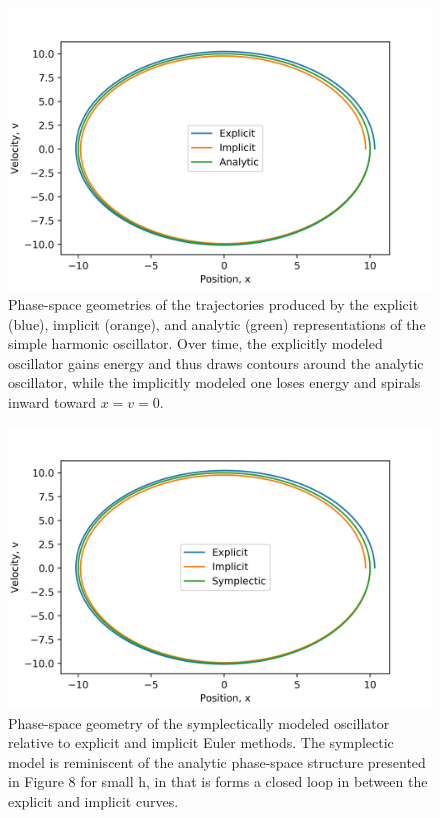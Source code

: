 \documentclass{article}
\begin{document}
\begin{figure}[H]
\includegraphics[width=\textwidth]{phase1.jpg}
\caption{Phase-space geometries of the trajectories produced by the explicit (blue), implicit (orange), and analytic (green) representations of the simple harmonic oscillator. Over time, the explicitly modeled oscillator gains energy and thus draws contours around the analytic oscillator, while the implicitly modeled one loses energy and spirals inward toward $x = v = 0$.}
\end{figure}

\begin{figure}[H]
\includegraphics[width=\textwidth]{phase2.jpg}
\caption{Phase-space geometry of the symplectically modeled oscillator relative to explicit and implicit Euler methods. The symplectic model is reminiscent of the analytic phase-space structure presented in Figure 8 for small h, in that is forms a closed loop in between the explicit and implicit curves.}
\end{figure}
\end{document}
